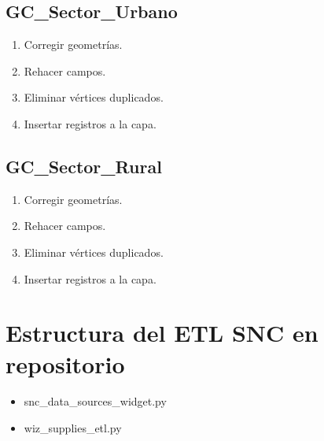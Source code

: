 \documentclass[letterpaper,10pt,spanish]{sphinxmanual}
\begin{document}
\subsection{GC\_Sector\_Urbano}
\label{\detokenize{ETL_SNC/Model:gc-sector-urbano}}\begin{enumerate}
%
\item {} 
Corregir geometrías.

\item {} 
Rehacer campos.

\item {} 
Eliminar vértices duplicados.

\item {} 
Insertar registros a la capa.


\end{enumerate}


\subsection{GC\_Sector\_Rural}
\label{\detokenize{ETL_SNC/Model:gc-sector-rural}}\begin{enumerate}
%
\item {} 
Corregir geometrías.

\item {} 
Rehacer campos.

\item {} 
Eliminar vértices duplicados.

\item {} 
Insertar registros a la capa.


\end{enumerate}


\section{Estructura del ETL SNC en repositorio}
\label{\detokenize{ETL_SNC/Repository:estructura-del-etl-snc-en-repositorio}}\label{\detokenize{ETL_SNC/Repository::doc}}

\begin{itemize}
\item {} 
snc\_data\_sources\_widget.py

\item {} 
wiz\_supplies\_etl.py

\end{itemize}
\end{document}
